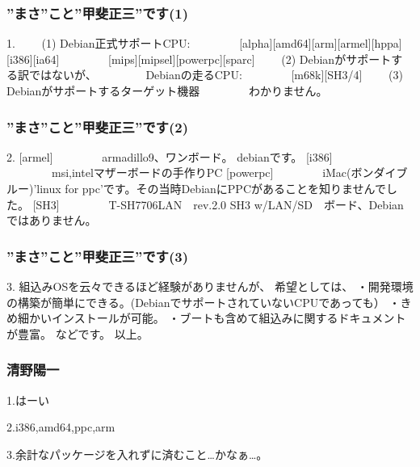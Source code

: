 \documentclass[cjk,dvipdfmx,12pt,%
hyperref={bookmarks=true,bookmarksnumbered=true,bookmarksopen=false,%
colorlinks=false,%
pdftitle={第38回関西Debian勉強会},%
pdfauthor={倉敷・のがた・佐々木},%
pdfsubject={資料},%
}]{beamer}
\begin{document}
\begin{frame}[fragile]
\frametitle{ ”まさ”こと”甲斐正三”です(1) }


{\small
\begin{verbatimtab}
1.
　　(1) Debian正式サポートCPU:
　　　　[alpha][amd64][arm][armel][hppa][i386][ia64]
　　　　[mips][mipsel][powerpc][sparc]
　　(2) Debianがサポートする訳ではないが、
　　　　Debianの走るCPU:
　　　　[m68k][SH3/4]
　　(3) Debianがサポートするターゲット機器
　　　　わかりません。
\end{verbatimtab}
}


\end{frame}
\begin{frame}[fragile]
\frametitle{ ”まさ”こと”甲斐正三”です(2) }


{\small
\begin{verbatimtab}

2.
    [armel]
　　　　armadillo9、ワンボード。 debianです。
    [i386]
　　　　msi,intelマザーボードの手作りPC
    [powerpc]
　　　　iMac(ボンダイブルー)'linux for ppc'です。その当時DebianにPPCがあることを知りませんでした。
    [SH3]
　　　　T-SH7706LAN　rev.2.0 SH3 w/LAN/SD　ボード、Debianではありません。

\end{verbatimtab}
}


\end{frame}
\begin{frame}[fragile]
\frametitle{ ”まさ”こと”甲斐正三”です(3) }


{\small
\begin{verbatimtab}

3.
    組込みOSを云々できるほど経験がありませんが、
    希望としては、
      ・開発環境の構築が簡単にできる。(DebianでサポートされていないCPUであっても）
      ・きめ細かいインストールが可能。
      ・ブートも含めて組込みに関するドキュメントが豊富。
    などです。
以上。
\end{verbatimtab}
}


\end{frame}

\begin{frame}[fragile]
\frametitle{  清野陽一 }



\begin{verbatimtab}
1.はーい

2.i386,amd64,ppc,arm

3.余計なパッケージを入れずに済むこと…かなぁ…。
\end{verbatimtab}


\end{frame}
\end{document}
